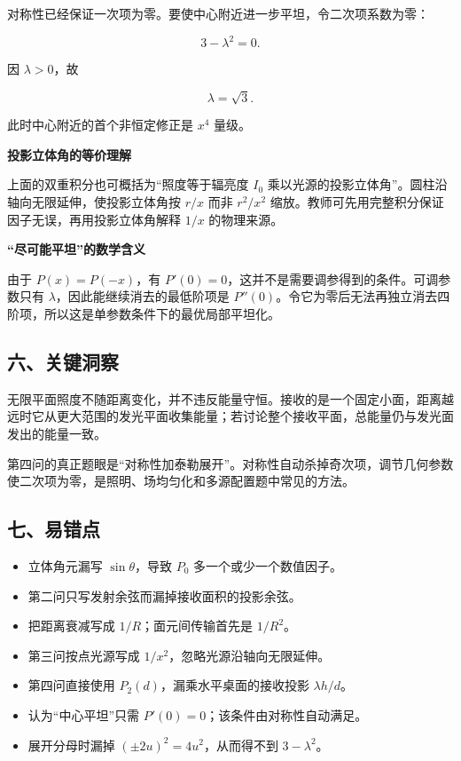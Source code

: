 \documentclass[12pt,a4paper,UTF8]{ctexart}
\newcommand{\tightlist}{\setlength{\itemsep}{0pt}\setlength{\parskip}{0pt}}
\begin{document}
对称性已经保证一次项为零。要使中心附近进一步平坦，令二次项系数为零：

\[3-\lambda^2=0.\]

因 \(\lambda>0\)，故

\[\boxed{\lambda=\sqrt3}.\]

此时中心附近的首个非恒定修正是 \(x^4\) 量级。

\textbf{投影立体角的等价理解}

上面的双重积分也可概括为``照度等于辐亮度 \(I_0\)
乘以光源的投影立体角''。圆柱沿轴向无限延伸，使投影立体角按 \(r/x\) 而非
\(r^2/x^2\) 缩放。教师可先用完整积分保证因子无误，再用投影立体角解释
\(1/x\) 的物理来源。

\textbf{``尽可能平坦''的数学含义}

由于 \(P(x)=P(-x)\)，有
\(P'(0)=0\)，这并不是需要调参得到的条件。可调参数只有
\(\lambda\)，因此能继续消去的最低阶项是
\(P''(0)\)。令它为零后无法再独立消去四阶项，所以这是单参数条件下的最优局部平坦化。

\subsection{六、关键洞察}\label{ux516dux5173ux952eux6d1eux5bdf-3}

无限平面照度不随距离变化，并不违反能量守恒。接收的是一个固定小面，距离越远时它从更大范围的发光平面收集能量；若讨论整个接收平面，总能量仍与发光面发出的能量一致。

第四问的真正题眼是``对称性加泰勒展开''。对称性自动杀掉奇次项，调节几何参数使二次项为零，是照明、场均匀化和多源配置题中常见的方法。

\subsection{七、易错点}\label{ux4e03ux6613ux9519ux70b9-3}

\begin{itemize}
\tightlist
\item
  立体角元漏写 \(\sin\theta\)，导致 \(P_0\) 多一个或少一个数值因子。
\item
  第二问只写发射余弦而漏掉接收面积的投影余弦。
\item
  把距离衰减写成 \(1/R\)；面元间传输首先是 \(1/R^2\)。
\item
  第三问按点光源写成 \(1/x^2\)，忽略光源沿轴向无限延伸。
\item
  第四问直接使用 \(P_2(d)\)，漏乘水平桌面的接收投影 \(\lambda h/d\)。
\item
  认为``中心平坦''只需 \(P'(0)=0\)；该条件由对称性自动满足。
\item
  展开分母时漏掉 \((\pm2u)^2=4u^2\)，从而得不到 \(3-\lambda^2\)。
\end{itemize}
\end{document}
